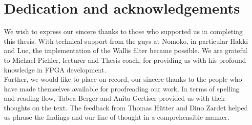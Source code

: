 
\chapter*{Dedication and acknowledgements}
\begin{SingleSpace}





We wish to express our sincere thanks to those who supported us in completing
this thesis. With technical support from the guys at Nomoko, in particular Hakki
and
Luc, the implementation of the Wallis filter became possible. We are
grateful to Michael Pichler, lecturer and Thesis coach, for providing us with
his profound knowledge in FPGA development. 
\\

Further, we would like to place on record, our sincere thanks to the people who
have made themselves available for proofreading our work. In terms of spelling
and reading flow, Tabea Berger and Anita Gertiser provided us with their
thoughts on the text. The feedback from Thomas H\"utter and Dino Zardet helped
us phrase the findings and our line of thought in a comprehensible manner.


%
%
%

 \end{SingleSpace} \clearpage